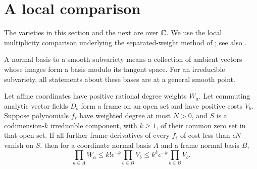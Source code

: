 \section{A local comparison}\label{sec:local}

The varieties in this section and the next are over \(\mathbb C\).
We use the local multiplicity comparison underlying the
separated-weight method of \cite{OAIpi}; see also
\cite[Lemma 3]{LJZ2026}.

A normal basis to a smooth subvariety means a collection of ambient
vectors whose images form a basis modulo its tangent space. For an
irreducible subvariety, all statements about these bases are at a
general smooth point.

\begin{lemma}\label{lem:local}
Let affine coordinates have positive rational degree weights
\(W_a\). Let commuting analytic vector fields \(D_b\) form a frame
on an open set and have positive costs \(V_b\). Suppose polynomials
\(f_\ell\) have weighted degree at most \(N>0\), and \(S\) is a
codimension-\(k\) irreducible component, with \(k\geq1\), of their common zero set in
that open set. If all further frame derivatives of every \(f_\ell\)
of cost less than \(\epsilon N\) vanish on \(S\), then for a
coordinate normal basis \(A\) and a frame normal basis \(B\),
\begin{equation}\label{eq:comparison}
 \prod_{a\in A}W_a
 \leq k!\epsilon^{-k}\prod_{b\in B}V_b
 \leq k^k\epsilon^{-k}\prod_{b\in B}V_b.
\end{equation}
\end{lemma}
